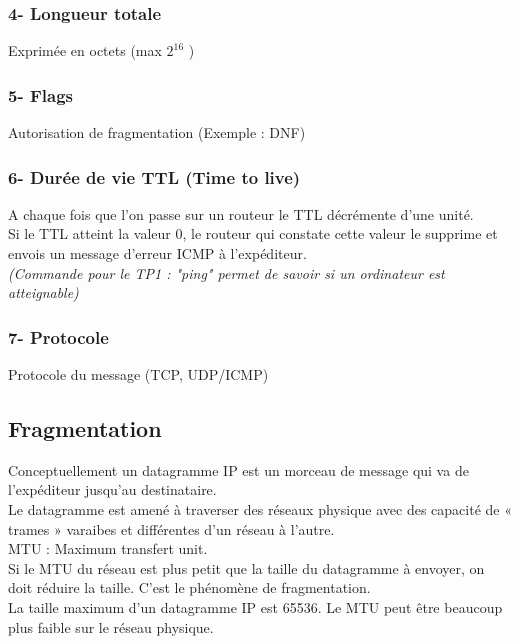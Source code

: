 \documentclass{article}
\begin{document}
\subsubsection*{4- Longueur totale}
Exprimée en octets (max $2^{16}$ )

\newpage
\subsubsection*{5- Flags}
Autorisation de fragmentation (Exemple : DNF)

\subsubsection*{6- Durée de vie TTL (Time to live)}
A chaque fois que l’on passe sur un routeur le TTL décrémente d’une unité. \\
Si le TTL atteint la valeur 0, le routeur qui constate cette valeur le supprime et envois un message d’erreur ICMP à l’expéditeur. \\
\textit{(Commande pour le TP1 : "ping" permet de savoir si un ordinateur est atteignable)}

\subsubsection*{7- Protocole}
Protocole du message (TCP, UDP/ICMP)

\subsection{Fragmentation}
Conceptuellement un datagramme IP est un morceau de message qui va de l’expéditeur jusqu’au destinataire. \\
Le datagramme est amené à traverser des réseaux physique avec des capacité de « trames » varaibes et différentes d’un réseau à l’autre. \\
MTU : Maximum transfert unit. \\  
Si le MTU du réseau est plus petit que la taille du datagramme à envoyer, on doit réduire la taille. C’est le phénomène de fragmentation. \\
La taille maximum d’un datagramme IP est 65536. Le MTU peut être beaucoup plus faible sur le réseau physique. \\
\end{document}
